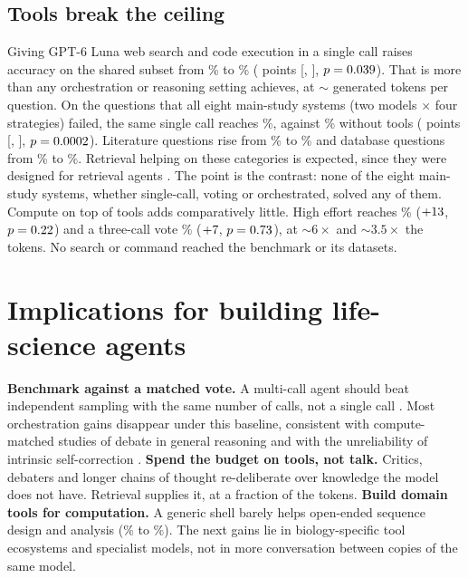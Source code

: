 \documentclass{article}
\begin{document}
\subsection{Tools break the ceiling}\label{sec:tools}
Giving GPT-6 Luna web search and code execution in a single call raises accuracy on the shared subset from \ToolsNoThirty\% to \ToolsYesThirty\% (\ToolsDThirty{} points [\ToolsDThirtyLo, \ToolsDThirtyHi], $p=0.039$).
That is more than any orchestration or reasoning setting achieves, at ${\sim}$\ToolsTokThirty{} generated tokens per question.
On the \ToolsNUnsolved{} questions that all eight main-study systems (two models $\times$ four strategies) failed, the same single call reaches \ToolsYesUnsolved\%, against \ToolsNoUnsolved\% without tools (\ToolsDUnsolved{} points [\ToolsDUnsolvedLo, \ToolsDUnsolvedHi], $p=0.0002$).
Literature questions rise from \ToolsLitNoUnsolved\% to \ToolsLitYesUnsolved\% and database questions from \ToolsDbNoUnsolved\% to \ToolsDbYesUnsolved\%.
Retrieval helping on these categories is expected, since they were designed for retrieval agents \citep{laurent2024labbench,futurehouse2024paperqa2}. The point is the contrast: none of the eight main-study systems, whether single-call, voting or orchestrated, solved any of them.
Compute on top of tools adds comparatively little. High effort reaches \ToolsHighAccThirty\% ($+13$, $p=0.22$) and a three-call vote \ToolsVoteAccThirty\% ($+7$, $p=0.73$), at ${\sim}6\times$ and ${\sim}3.5\times$ the tokens.
No search or command reached the benchmark or its datasets.

\section{Implications for building life-science agents}
\textbf{Benchmark against a matched vote.} A multi-call agent should beat independent sampling with the same number of calls, not a single call \citep{kapoor2024agentsmatters}. Most orchestration gains disappear under this baseline, consistent with compute-matched studies of debate in general reasoning \citep{wang2024rethinking,smit2024mad,choi2025debatevsvote,wu2025candebate} and with the unreliability of intrinsic self-correction \citep{huang2023cannotcorrect}.
\textbf{Spend the budget on tools, not talk.} Critics, debaters and longer chains of thought re-deliberate over knowledge the model does not have. Retrieval supplies it, at a fraction of the tokens.
\textbf{Build domain tools for computation.} A generic shell barely helps open-ended sequence design and analysis (\ToolsSeqQAIINoUnsolved\% to \ToolsSeqQAIIYesUnsolved\%). The next gains lie in biology-specific tool ecosystems and specialist models, not in more conversation between copies of the same model.
\end{document}
